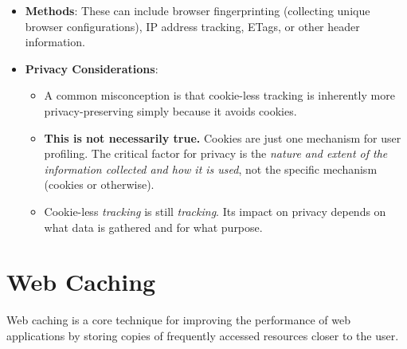 \documentclass[../../compsys.tex]{subfiles}
\begin{document}
\begin{itemize}
    \item \textbf{Methods}: These can include browser fingerprinting (collecting unique browser configurations), IP address tracking, ETags, or other header information.
    \item \textbf{Privacy Considerations}:
    \begin{itemize}
        \item A common misconception is that cookie-less tracking is inherently more privacy-preserving simply because it avoids cookies.
        \item \textbf{This is not necessarily true.} Cookies are just one mechanism for user profiling. The critical factor for privacy is the \textit{nature and extent of the information collected and how it is used}, not the specific mechanism (cookies or otherwise).
        \item Cookie-less \textit{tracking} is still \textit{tracking}. Its impact on privacy depends on what data is gathered and for what purpose.
    \end{itemize}
\end{itemize}
\newpage

\section{Web Caching}
Web caching is a core technique for improving the performance of web applications by storing copies of frequently accessed resources closer to the user.
\end{document}
